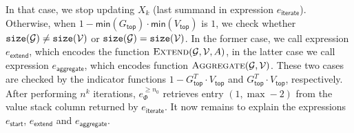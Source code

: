 In that case, we stop updating $X_k$ (last summand in expression $e_{\mathsf{iterate}}$). Otherwise, when $1-\mathsf{min}(G_{\mathsf{top}})\cdot \mathsf{min}(V_{\mathsf{top}})$ is $1$, we check whether $\texttt{size}(\mathcal{G})\neq \texttt{size}(\mathcal{V})$ or $\texttt{size}(\mathcal{G})=\texttt{size}(\mathcal{V})$. In the former case, we call expression $e_{\mathsf{extend}}$, which encodes the function $\textsc{Extend}(\mathcal{G},\mathcal{V},A)$, in the latter case we call expression $e_{\mathsf{aggregate}}$, which encodes function $\textsc{Aggregate}(\mathcal{G},\mathcal{V})$. These two cases are checked by the indicator functions $1 - G_{\mathsf{top}}^T\cdot V_{\mathsf{top}}$ and $G_{\mathsf{top}}^T\cdot V_{\mathsf{top}}$, respectively. After performing $n^k$ iterations, $e_\Phi^{\geq n_0}$ retrieves entry $(1,\max-2)$ from the value stack column returned by $e_{\mathsf{iterate}}$. It now remains to explain the expressions $e_{\mathsf{start}}$, $e_{\mathsf{extend}}$ and $e_{\mathsf{aggregate}}$.

